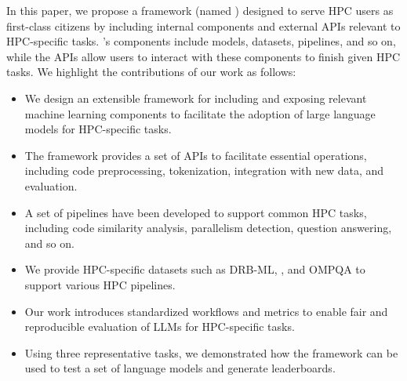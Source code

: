 In this paper, we propose a framework (named \ourwork) designed to serve HPC users as first-class citizens by including internal components and external APIs relevant to HPC-specific tasks. \ourwork's components include models, datasets, pipelines, and so on, while the APIs allow users to interact with these components to finish given HPC tasks. We highlight the contributions of our work as follows:
\begin{itemize}
    \item We design an extensible framework for including and exposing relevant machine learning components to facilitate the adoption of large language models for HPC-specific tasks. 
    \item The framework provides a set of APIs to facilitate essential operations, including code preprocessing, tokenization, integration with new data, and evaluation.
    \item A set of pipelines have been developed to support common HPC tasks, including code similarity analysis, parallelism detection, question answering, and so on.   
    \item We provide HPC-specific datasets such as DRB-ML, \crawldata, and OMPQA to support various HPC pipelines.  
    \item Our work introduces standardized workflows and metrics to enable fair and reproducible evaluation of LLMs for HPC-specific tasks.
    \item Using three representative tasks, we demonstrated how the framework can be used to test a set of language models and generate leaderboards.
\end{itemize}

